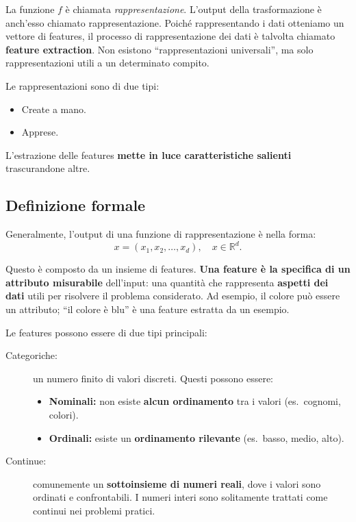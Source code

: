 La funzione $f$ \`e chiamata \emph{rappresentazione}. L'output della trasformazione \`e anch'esso chiamato rappresentazione. Poich\'e rappresentando i dati otteniamo un vettore di features, il processo di rappresentazione dei dati \`e talvolta chiamato \textbf{feature extraction}. Non esistono ``rappresentazioni universali'', ma solo rappresentazioni utili a un determinato compito.

\noindent
Le rappresentazioni sono di due tipi:
\begin{itemize}
\item Create a mano.
\item Apprese.
\end{itemize}

\noindent
L'estrazione delle features \textbf{mette in luce caratteristiche salienti} trascurandone altre.

\subsection{Definizione formale}

Generalmente, l'output di una funzione di rappresentazione \`e nella forma:
\[
x = (x_1, x_2, \dots, x_d), \quad x \in \mathbb{R}^d.
\]

\noindent
Questo \`e composto da un insieme di features. \textbf{Una feature \`e la specifica di un attributo misurabile} dell'input: una quantit\`a che rappresenta \textbf{aspetti dei dati} utili per risolvere il problema considerato. Ad esempio, il colore pu\`o essere un attributo; ``il colore \`e blu'' \`e una feature estratta da un esempio.

\noindent
Le features possono essere di due tipi principali:
\begin{description}
    \item[Categoriche:] un numero finito di valori discreti. Questi possono essere:
    \begin{itemize}
        \item \textbf{Nominali:} non esiste \textbf{alcun ordinamento} tra i valori (es.\ cognomi, colori).
        \item \textbf{Ordinali:} esiste un \textbf{ordinamento rilevante} (es.\ basso, medio, alto).
    \end{itemize}
    \item[Continue:] comunemente un \textbf{sottoinsieme di numeri reali}, dove i valori sono ordinati e confrontabili. I numeri interi sono solitamente trattati come continui nei problemi pratici.
\end{description}

